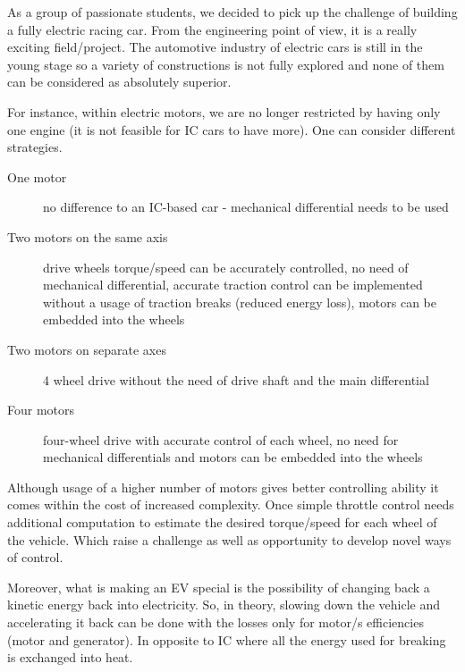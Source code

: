 As a group of passionate students, we decided to pick up the challenge of building a fully electric racing car. From the engineering point of view, it is a really exciting field/project. The automotive industry of electric cars is still in the young stage so a variety of constructions is not fully explored and none of them can be considered as absolutely superior.


For instance, within electric motors, we are no longer restricted by having only one engine (it is not feasible for IC cars to have more). One can consider different strategies.
\begin{description}
    \item[One motor] no difference to an IC-based car - mechanical differential needs to be used
    \item[Two motors on the same axis] drive wheels torque/speed can be accurately controlled, no need of mechanical differential, accurate traction control can be implemented without a usage of traction breaks (reduced energy loss), motors can be embedded into the wheels
    \item[Two motors on separate axes] 4 wheel drive without the need of drive shaft and the main differential
    \item[Four motors] four-wheel drive with accurate control of each wheel, no need for mechanical differentials and motors can be embedded into the wheels
\end{description}
Although usage of a higher number of motors gives better controlling ability it comes within the cost of increased complexity. Once simple throttle control needs additional computation to estimate the desired torque/speed for each wheel of the vehicle. Which raise a challenge as well as opportunity to develop novel ways of control.

Moreover, what is making an EV special is the possibility of changing back a kinetic energy back into electricity. So, in theory, slowing down the vehicle and accelerating it back can be done with the losses only for motor/s efficiencies (motor and generator). In opposite to IC where all the energy used for breaking is exchanged into heat.



